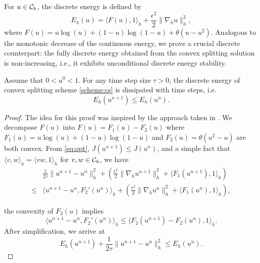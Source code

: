 For $u\in {\mathcal{C}_h}$, the discrete energy is defined by
\begin{equation}
\label{eq:discrete-energy}
    E_h(u)=\langle F(u),1 \rangle_h+\frac{\epsilon^2}{2}\|\nabla_h u\|_h^2,
\end{equation}
where $F(u)=u\log(u)+(1-u)\log(1-u)+\theta(u-u^2)$. Analogous to the monotonic decrease of the continuous energy, we prove a crucial discrete counterpart: 
the fully discrete energy obtained from the convex splitting solution is non-increasing, i.e., it exhibits unconditional discrete energy stability.
\begin{theorem}\label{thm:energy-stability} 
    Assume that $0< u^0<1$. For any time step size $\tau>0$, the discrete energy of convex splitting scheme \eqref{scheme:cs} is dissipated with time steps, i.e.
    \begin{equation}
        E_h(u^{n+1})\leq E_h(u^n).
    \end{equation}
\end{theorem}
\begin{proof}
    The idea for this proof was inspired by the approach taken in \cite{eyre1998unconditionally}. 
    We decompose $F(u)$ into $F(u)=F_1(u)-F_2(u)$ where $F_1(u)=u\log(u)+(1-u)\log(1-u)$ and  $F_2(u)=\theta(u^2-u)$ are both convex. 
    From \eqref{eq:opt}, $J(u^{n+1})\leq J(u^n)$, and a simple fact that $\langle v,w \rangle_h = \langle vw,1 \rangle_h$ for $v,w \in {\mathcal{C}_h}$, we have
    \begin{equation}
        \begin{aligned}
        &\frac{1}{2\tau}\|u^{n+1}-u^n\|_h^2+(\frac{\epsilon^2}{2}\|\nabla_hu^{n+1}\|_h^2+\langle F_1(u^{n+1}),1 \rangle_h)
        \\
        \leq& \langle u^{n+1}-u^n, F_2'(u^n)\rangle_h
        +(\frac{\epsilon^2}{2}\|\nabla_hu^{n}\|_h^2+\langle F_1(u^{n}),1 \rangle_h)
        ,
    \end{aligned}
    \end{equation}
    
the convexity of $F_2(u)$ implies\begin{equation}
    \langle u^{n+1}-u^n, F_2'(u^n)\rangle_h\leq 
    \langle F_2(u^{n+1})-F_2(u^n),1 \rangle_h.
\end{equation}
    After simplification, we arrive at
\begin{equation}
    E_h(u^{n+1})+\frac{1}{2\tau}\|u^{n+1}-u^n\|_h^2\leq E_h(u^n).
\end{equation}
\end{proof}


